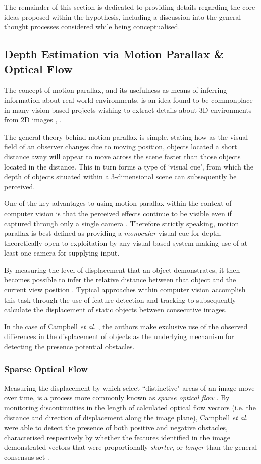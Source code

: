 The remainder of this section is dedicated to providing details regarding the core ideas proposed within the hypothesis, including a discussion into the general thought processes considered while being conceptualised.

\subsection{Depth Estimation via Motion Parallax \& Optical Flow}

The concept of motion parallax, and its usefulness as means of inferring information about real-world environments, is an idea found to be commonplace in many vision-based projects wishing to extract details about 3D environments from 2D images \cite{}, \cite{}.  

The general theory behind motion parallax is simple, stating how as the visual field of an observer changes due to moving position, objects located a short distance away will appear to move across the scene faster than those objects located in the distance. This in turn forms a type of `visual cue', from which the depth of objects situated within a 3-dimensional scene can subsequently be perceived.

One of the key advantages to using motion parallax within the context of computer vision is that the perceived effects continue to be visible even if captured through only a single camera \cite{}. Therefore strictly speaking, motion parallax is best defined as providing a \textit{monocular} visual cue for depth, theoretically open to exploitation by any visual-based system making use of at least one camera for supplying input.
 
 By measuring the level of displacement that an object demonstrates, it then becomes possible to infer the relative distance between that object and the current view position \cite{}. Typical approaches within computer vision accomplish this task through the use of feature detection and tracking to subsequently calculate the displacement of static objects between consecutive images. 

In the case of Campbell \textit{et al.} \cite{campbell}, the authors make exclusive use of the observed differences in the displacement of objects as the underlying mechanism for  detecting the presence potential obstacles. 

\subsubsection{Sparse Optical Flow}
Measuring the displacement by which select ``distinctive" areas of an image move over time, is a process more commonly known as \textit{sparse optical flow} \cite{nourani}. By monitoring discontinuities in the length of calculated optical flow vectors (i.e. the distance and direction of displacement along the image plane), Campbell \textit{et al.} were able to detect the presence of both positive and negative obstacles, characterised respectively by whether the features identified in the image demonstrated vectors that were proportionally \textit{shorter}, or \textit{longer} than the general consensus set \cite{campbell}.


